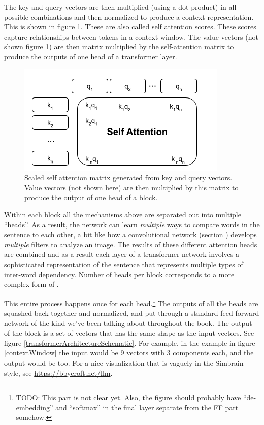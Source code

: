 The key and query vectors are then multiplied (using a dot product) in all possible combinations and then normalized to produce a context representation. This is shown in figure \ref{selfAttention}. These are also called self attention scores. These scores capture relationships between tokens in a context window.  The value vectors (not shown figure \ref{selfAttention}) are then matrix multiplied by the self-attention matrix to produce the outputs of one head of a transformer layer.

\begin{figure}[h]
\centering
\includegraphics[scale=.6]{./images/selfAttention.png}
\caption[Jeff Yoshimi with consultation from Tim Meyer.]{Scaled self attention matrix generated from key and query vectors. Value vectors (not shown here) are then multiplied by this matrix to produce the output of one head of a block.}
\label{selfAttention}
\end{figure}

Within each block all the mechanisms above are separated out into multiple ``heads''. As a result, the network can learn \emph{multiple} ways to compare words in the sentence to each other, a bit like how a convolutional network (section ) develops \emph{multiple} filters to analyze an image. The results of these different attention heads are combined and as a result each layer of a transformer network involves a sophisticated representation of the sentence that represents multiple types of inter-word dependency. Number of heads per block corresponds to a more complex form of .

This entire process happens once for each head.\footnote{TODO: This part is not clear yet. Also, the figure should probably have ``de-embedding'' and ``softmax'' in the final layer separate from the FF part somehow.} The outputs of all the heads are squashed back together and normalized, and put through a standard feed-forward network of the kind we've been talking about throughout the book. The output of the block is a set of vectors that has the same shape as the input vectors. See figure \ref{transformerArchitectureSchematic}.  For example, in the example in figure \ref{contextWindow} the input would be 9 vectors with 3 components each, and the output would be too. For a nice visualization that is vaguely in the Simbrain style, see \url{https://bbycroft.net/llm}.

